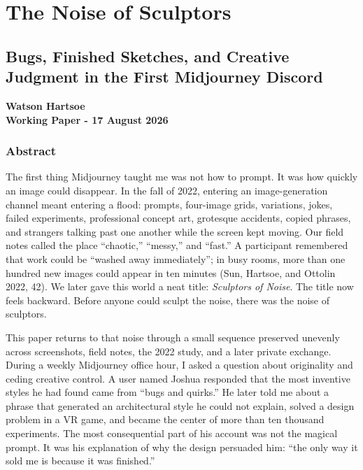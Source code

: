 \documentclass[
]{article}
\author{}
\date{}
\begin{document}
\section{The Noise of Sculptors}\label{the-noise-of-sculptors}

\subsection{Bugs, Finished Sketches, and Creative Judgment in the First
Midjourney
Discord}\label{bugs-finished-sketches-and-creative-judgment-in-the-first-midjourney-discord}

\textbf{Watson Hartsoe}\\
\textbf{Working Paper - 17 August 2026}

\subsubsection{Abstract}\label{abstract}

The first thing Midjourney taught me was not how to prompt. It was how
quickly an image could disappear. In the fall of 2022, entering an
image-generation channel meant entering a flood: prompts, four-image
grids, variations, jokes, failed experiments, professional concept art,
grotesque accidents, copied phrases, and strangers talking past one
another while the screen kept moving. Our field notes called the place
``chaotic,'' ``messy,'' and ``fast.'' A participant remembered that work
could be ``washed away immediately''; in busy rooms, more than one
hundred new images could appear in ten minutes (Sun, Hartsoe, and
Ottolin 2022, 42). We later gave this world a neat title:
\emph{Sculptors of Noise}. The title now feels backward. Before anyone
could sculpt the noise, there was the noise of sculptors.

This paper returns to that noise through a small sequence preserved
unevenly across screenshots, field notes, the 2022 study, and a later
private exchange. During a weekly Midjourney office hour, I asked a
question about originality and ceding creative control. A user named
Joshua responded that the most inventive styles he had found came from
``bugs and quirks.'' He later told me about a phrase that generated an
architectural style he could not explain, solved a design problem in a
VR game, and became the center of more than ten thousand experiments.
The most consequential part of his account was not the magical prompt.
It was his explanation of why the design persuaded him: ``the only way
it sold me is because it was finished.''
\end{document}
